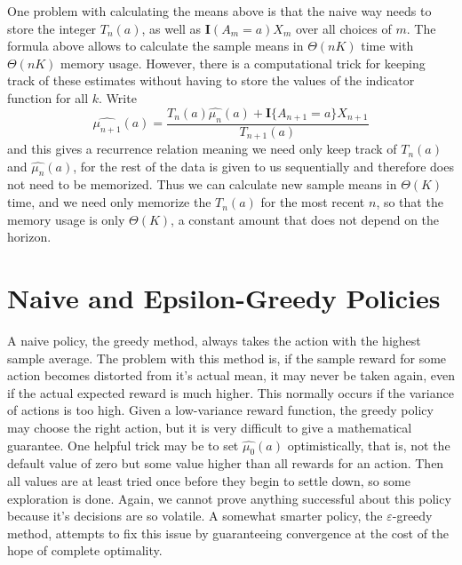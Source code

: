 One problem with calculating the means above is that the naive way needs to store the integer $T_n(a)$, as well as $\mathbf{I}(A_m = a) X_m$ over all choices of $m$. The formula above allows to calculate the sample means in $\Theta(nK)$ time with $\Theta(nK)$ memory usage. However, there is a computational trick for keeping track of these estimates without having to store the values of the indicator function for all $k$. Write
%
\[ \widehat{\mu_{n+1}}(a) = \frac{T_n(a) \widehat{\mu_n}(a) + \mathbf{I} \{ A_{n+1} = a \} X_{n+1}}{T_{n+1}(a)} \]
%
and this gives a recurrence relation meaning we need only keep track of $T_n(a)$ and $\widehat{\mu_n}(a)$, for the rest of the data is given to us sequentially and therefore does not need to be memorized. Thus we can calculate new sample means in $\Theta(K)$ time, and we need only memorize the $T_n(a)$ for the most recent $n$, so that the memory usage is only $\Theta(K)$, a constant amount that does not depend on the horizon.

\section{Naive and Epsilon-Greedy Policies}

A naive policy, the greedy method, always takes the action with the highest sample average. The problem with this method is, if the sample reward for some action becomes distorted from it's actual mean, it may never be taken again, even if the actual expected reward is much higher. This normally occurs if the variance of actions is too high. Given a low-variance reward function, the greedy policy may choose the right action, but it is very difficult to give a mathematical guarantee. One helpful trick may be to set $\widehat{\mu_0}(a)$ optimistically, that is, not the default value of zero but some value higher than all rewards for an action. Then all values are at least tried once before they begin to settle down, so some exploration is done. Again, we cannot prove anything successful about this policy because it's decisions are so volatile. A somewhat smarter policy, the $\varepsilon$-greedy method, attempts to fix this issue by guaranteeing convergence at the cost of the hope of complete optimality.

